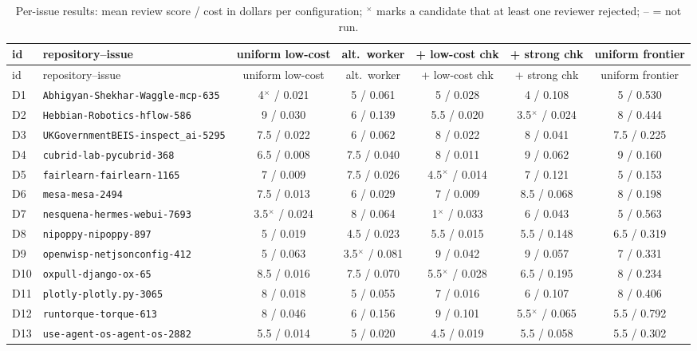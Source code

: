 \begin{longtable}{llccccc}\caption{Per-issue results: mean review score / cost in dollars per configuration; $^\times$ marks a candidate that at least one reviewer rejected; -- = not run.}\label{tab:perissue}\\\toprule
id & repository--issue & uniform low-cost & alt.\ worker & + low-cost chk & + strong chk & uniform frontier\\\midrule\endfirsthead
\toprule
id & repository--issue & uniform low-cost & alt.\ worker & + low-cost chk & + strong chk & uniform frontier\\\midrule\endhead
D1 & \texttt{Abhigyan-Shekhar-Waggle-mcp-635} & 4$^\times$ / 0.021 & 5 / 0.061 & 5 / 0.028 & 4 / 0.108 & 5 / 0.530\\
D2 & \texttt{Hebbian-Robotics-hflow-586} & 9 / 0.030 & 6 / 0.139 & 5.5 / 0.020 & 3.5$^\times$ / 0.024 & 8 / 0.444\\
D3 & \texttt{UKGovernmentBEIS-inspect\_ai-5295} & 7.5 / 0.022 & 6 / 0.062 & 8 / 0.022 & 8 / 0.041 & 7.5 / 0.225\\
D4 & \texttt{cubrid-lab-pycubrid-368} & 6.5 / 0.008 & 7.5 / 0.040 & 8 / 0.011 & 9 / 0.062 & 9 / 0.160\\
D5 & \texttt{fairlearn-fairlearn-1165} & 7 / 0.009 & 7.5 / 0.026 & 4.5$^\times$ / 0.014 & 7 / 0.121 & 5 / 0.153\\
D6 & \texttt{mesa-mesa-2494} & 7.5 / 0.013 & 6 / 0.029 & 7 / 0.009 & 8.5 / 0.068 & 8 / 0.198\\
D7 & \texttt{nesquena-hermes-webui-7693} & 3.5$^\times$ / 0.024 & 8 / 0.064 & 1$^\times$ / 0.033 & 6 / 0.043 & 5 / 0.563\\
D8 & \texttt{nipoppy-nipoppy-897} & 5 / 0.019 & 4.5 / 0.023 & 5.5 / 0.015 & 5.5 / 0.148 & 6.5 / 0.319\\
D9 & \texttt{openwisp-netjsonconfig-412} & 5 / 0.063 & 3.5$^\times$ / 0.081 & 9 / 0.042 & 9 / 0.057 & 7 / 0.331\\
D10 & \texttt{oxpull-django-ox-65} & 8.5 / 0.016 & 7.5 / 0.070 & 5.5$^\times$ / 0.028 & 6.5 / 0.195 & 8 / 0.234\\
D11 & \texttt{plotly-plotly.py-3065} & 8 / 0.018 & 5 / 0.055 & 7 / 0.016 & 6 / 0.107 & 8 / 0.406\\
D12 & \texttt{runtorque-torque-613} & 8 / 0.046 & 6 / 0.156 & 9 / 0.101 & 5.5$^\times$ / 0.065 & 5.5 / 0.792\\
D13 & \texttt{use-agent-os-agent-os-2882} & 5.5 / 0.014 & 5 / 0.020 & 4.5 / 0.019 & 5.5 / 0.058 & 5.5 / 0.302\\

\end{longtable}
